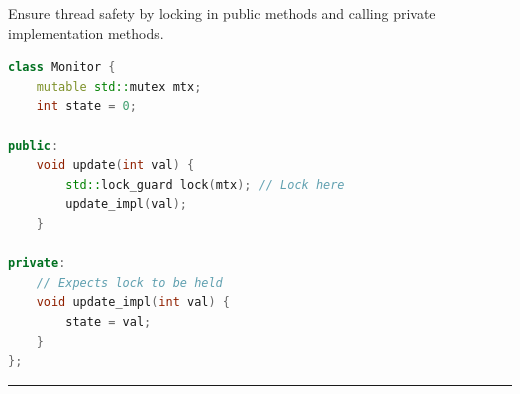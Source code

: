 Ensure thread safety by locking in public methods and calling private
implementation methods.

\begin{lstlisting}[language={C++}]
class Monitor {
    mutable std::mutex mtx;
    int state = 0;

public:
    void update(int val) {
        std::lock_guard lock(mtx); // Lock here
        update_impl(val);
    }

private:
    // Expects lock to be held
    void update_impl(int val) {
        state = val;
    }
};
\end{lstlisting}

\begin{center}\rule{0.5\linewidth}{0.5pt}\end{center}
